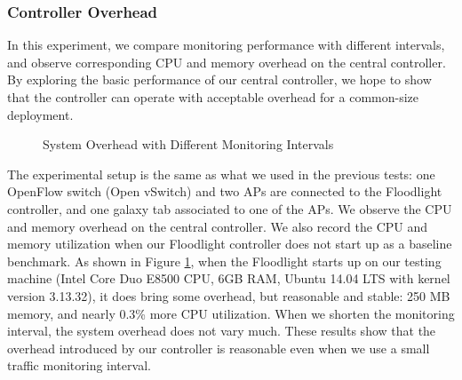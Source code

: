 \documentclass[english]{tktltiki}
\begin{document}
\subsubsection{Controller Overhead}

In this experiment, we compare monitoring performance with different intervals, and observe corresponding CPU and memory overhead on the central controller. By exploring the basic performance of our central controller, we hope to show that the controller can operate with acceptable overhead for a common-size deployment.

\begin{figure}[htbp]
  \centering
  \hspace{5pt}%
  \caption{System Overhead with Different Monitoring Intervals}
  \label{fig:interval}
\end{figure}

The experimental setup is the same as what we used in the previous tests: one OpenFlow switch (Open vSwitch) and two APs are connected to the Floodlight controller, and one galaxy tab associated to one of the APs. We observe the CPU and memory overhead on the central controller. We also record the CPU and memory utilization when our Floodlight controller does not start up as a baseline benchmark. As shown in Figure \ref{fig:interval}, when the Floodlight starts up on our testing machine (Intel Core Duo E8500 CPU, 6GB RAM, Ubuntu 14.04 LTS with kernel version 3.13.32), it does bring some overhead, but reasonable and stable: 250 MB memory, and nearly 0.3\% more CPU utilization. When we shorten the monitoring interval, the system overhead does not vary much. These results show that the overhead introduced by our controller is reasonable even when we use a small traffic monitoring interval.
\end{document}
